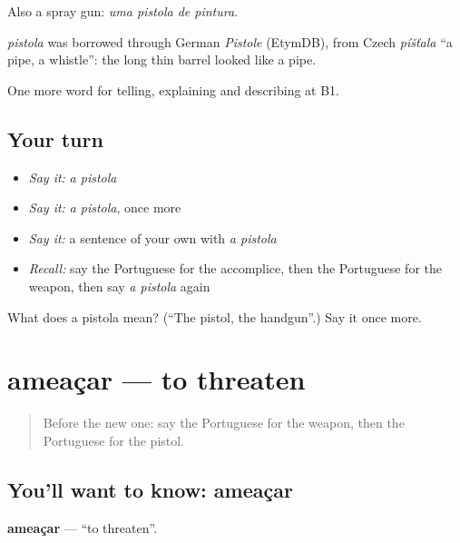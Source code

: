 Also a spray gun: \emph{uma pistola de pintura}.

\begin{cousinweb}
\emph{pistola} was borrowed through German \emph{Pistole} (EtymDB), from Czech \emph{píšťala} \textquotedblleft{}a pipe, a whistle\textquotedblright{}: the long thin barrel looked like a pipe.
\end{cousinweb}

\begin{grammarlens}[title={What you've built}]
One more word for telling, explaining and describing at B1.
\end{grammarlens}

\subsection*{Your turn}
\begin{itemize}
\raggedright
  \item \emph{Say it:} \emph{a pistola}
  \item \emph{Say it:} \emph{a pistola}, once more
  \item \emph{Say it:} a sentence of your own with \emph{a pistola}
  \item \emph{Recall:} say the Portuguese for the accomplice, then the Portuguese for the weapon, then say \emph{a pistola} again
\end{itemize}

\begin{tcolorbox}[breakable,colback=teal!4,colframe=teal!35!black,title={Before you move on}]
What does a pistola mean? (\textquotedblleft{}The pistol, the handgun\textquotedblright{}.) Say it once more.
\end{tcolorbox}
\section[ameaçar]{ameaçar — to threaten}

\label{lesson:PT-C290-ameacar}



\begin{quote}
Before the new one: say the Portuguese for the weapon, then the Portuguese for the pistol.
\end{quote}

\subsection*{You'll want to know: ameaçar}
\textbf{ameaçar} — \textquotedblleft{}to threaten\textquotedblright{}.

